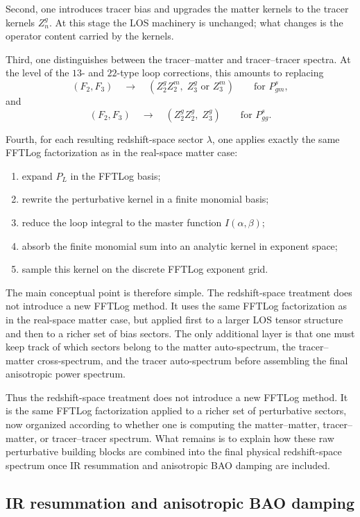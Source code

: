 \documentclass[a4paper,11pt]{article}
\newcommand{\<}{\langle}
\renewcommand{\>}{\rangle}
\begin{document}
Second, one introduces tracer bias and upgrades the matter kernels to the tracer kernels \(Z_n^g\). At this stage the LOS machinery is unchanged; what changes is the operator content carried by the kernels.

Third, one distinguishes between the tracer--matter and tracer--tracer spectra. At the level of the \(13\)- and \(22\)-type loop corrections, this amounts to replacing
\[
(F_2,F_3)
\quad\longrightarrow\quad
(Z_2^g Z_2^m,\; Z_3^g \text{ or } Z_3^m)
\qquad \text{for } P_{gm}^s,
\]
and
\[
(F_2,F_3)
\quad\longrightarrow\quad
(Z_2^g Z_2^g,\; Z_3^g)
\qquad \text{for } P_{gg}^s.
\]

Fourth, for each resulting redshift-space sector \(\lambda\), one applies exactly the same FFTLog factorization as in the real-space matter case:
\begin{enumerate}
\item expand \(P_L\) in the FFTLog basis;
\item rewrite the perturbative kernel in a finite monomial basis;
\item reduce the loop integral to the master function \(I(\alpha,\beta)\);
\item absorb the finite monomial sum into an analytic kernel in exponent space;
\item sample this kernel on the discrete FFTLog exponent grid.
\end{enumerate}

The main conceptual point is therefore simple. The redshift-space treatment does not introduce a new FFTLog method. It uses the same FFTLog factorization as in the real-space matter case, but applied first to a larger LOS tensor structure and then to a richer set of bias sectors. The only additional layer is that one must keep track of which sectors belong to the matter auto-spectrum, the tracer--matter cross-spectrum, and the tracer auto-spectrum before assembling the final anisotropic power spectrum.

Thus the redshift-space treatment does not introduce a new FFTLog method. It is the same FFTLog factorization applied to a richer set of perturbative sectors, now organized according to whether one is computing the matter--matter, tracer--matter, or tracer--tracer spectrum. What remains is to explain how these raw perturbative building blocks are combined into the final physical redshift-space spectrum once IR resummation and anisotropic BAO damping are included.

\subsection{IR resummation and anisotropic BAO damping}
\end{document}
